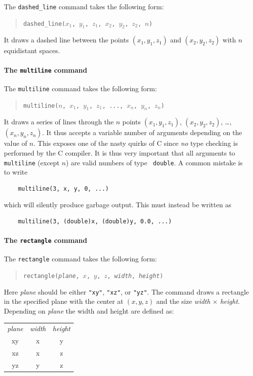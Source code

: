 The \texttt{dashed\_line} command takes the following form:
\begin{quote}
  \texttt{dashed\_line($x_1$, $y_1$, $z_1$, $x_2$, $y_2$, $z_2$, $n$)}
\end{quote}
It draws a dashed line between the points $(x_1, y_1, z_1)$ and $(x_2, y_2,
z_2)$ with $n$ equidistant spaces.


\paragraph{The \texttt{multiline} command}

The \texttt{multiline} command takes the following form:
\begin{quote}
  \texttt{multiline($n$, $x_1$, $y_1$, $z_1$, ..., $x_n$, $y_n$, $z_n$)}
\end{quote}
It draws a series of lines through the $n$ points $(x_1, y_1, z_1)$,
$(x_2, y_2, z_2)$, \ldots, $(x_n, y_n, z_n)$. It thus accepts a variable
number of arguments depending on the value of $n$. This exposes
one of the nasty quirks of C since \emph{no} type checking is
performed by the C compiler. It is thus very important that all
arguments to \texttt{multiline} (except $n$) are valid numbers of type \texttt{
  double}. A common mistake is to write
\begin{verbatim}
    multiline(3, x, y, 0, ...)
\end{verbatim}
which will silently produce garbage output. This must instead be
written as
\begin{verbatim}
    multiline(3, (double)x, (double)y, 0.0, ...)
\end{verbatim}

\paragraph{The \texttt{rectangle} command}

The \texttt{rectangle} command takes the following form:
\begin{quote}
  \texttt{rectangle(\textit{plane}, $x$, $y$, $z$, \textit{width}, \textit{height})}
\end{quote}
Here \textit{plane} should be either \verb+"xy"+, \verb+"xz"+, or
\verb+"yz"+. The command draws a rectangle in the specified plane with
the center at $(x, y, z)$ and the size \textit{width} $\times$ \textit{
height}. Depending on \textit{plane} the width and height are defined as:\\
\begin{tabular} {ccc}
  \textit{plane} & \textit{width} & \textit{height} \\
  xy & x & y \\
  xz & x & z \\
  yz & y & z \\
 \end{tabular}

